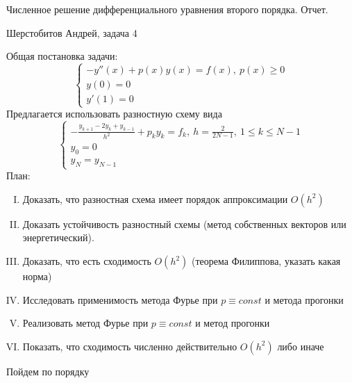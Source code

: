 \documentclass[12pt]{article}
\begin{document}
\begin{center}
Численное решение дифференциального уравнения второго порядка. Отчет.
\end{center}
\begin{center}
Шерстобитов Андрей, задача 4
\end{center}
Общая постановка задачи:
\[\begin{cases}
    -y''(x) +p(x)y(x) = f(x),\ p(x) \geq 0\\
    y(0) = 0 \\
    y'(1) = 0
\end{cases}\]
Предлагается использовать разностную схему вида
\[\begin{cases}
    -\frac{y_{k+1}-2y_k+y_{k-1}}{h^2}+p_ky_k = f_k,\ h = \frac{2}{2N-1},\ 1 \leq k \leq N-1 \\
    y_0 = 0 \\
    y_N = y_{N-1}
\end{cases}\]
План:
\begin{enumerate}[I.]
    \item Доказать, что разностная схема имеет порядок аппроксимации $O(h^2)$
    \item Доказать устойчивость разностный схемы (метод собственных векторов или энергетический).
    \item Доказать, что есть сходимость $O(h^2)$ (теорема Филиппова, указать какая норма)
    \item Исследовать применимость метода Фурье при $p \equiv const$ и метода прогонки
    \item Реализовать метод Фурье при $p\equiv const$ и метод прогонки
    \item Показать, что сходимость численно действительно $O(h^2)$ либо иначе
\end{enumerate}
Пойдем по порядку
\end{document}
